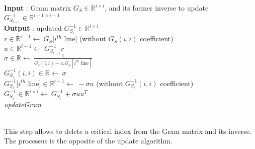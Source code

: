 \documentclass{ipol}
\newcommand{\RR}{\mathbb{R}}
\begin{document}
\begin{algorithm}[H]

\SetLine
\textbf{Input} : Gram matrix $G_S \in \mathbb{R}^{i \times i}$, and its former inverse to update $G_{S_{i-1}}^{-1}\in \mathbb{R}^{i-1 \times i-1}$\\
\textbf{Output} : updated  $G_{S_i}^{-1}\in \mathbb{R}^{i \times i}$\\
$r \in \mathbb{R}^{i-1} \leftarrow \  G_S[i^{th}$ line] (without $G_S(i,i)$ coefficient)\\
$u \in \mathbb{R}^{i-1} \leftarrow \ G_{S_{i-1}}^{-1} r$\\
$\sigma \in \mathbb{R} \leftarrow \ \frac{1}{G_s(i,i) - u.G_S[i^{th} \text{ line}]}$\\
$G_{S_i}^{-1}(i,i) \in \mathbb{R} \leftarrow \ \sigma$\\
$G_{S_i}^{-1}[i^{th}$ line]$\in \mathbb{R}^{i-1} \leftarrow \ -\sigma u$ (without $G_{S_i}^{-1}(i,i)$ coefficient)\\
\Return $G_{S_i}^{-1} \in \RR^{i \times i} \leftarrow \ G_{S_i}^{-1}+\sigma u u^T$\\
\caption{\textit{updateGram}}

\end{algorithm}\\

\noindent This step allows to delete a critical index from the Gram matrix and its inverse. The processus is the opposite of the update algorithm.\\
\end{document}
